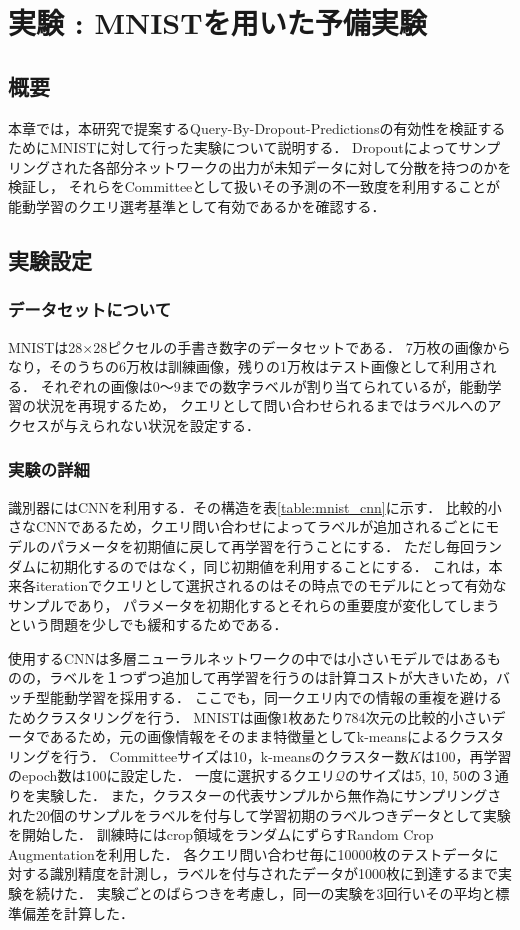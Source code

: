 \section{実験 : MNISTを用いた予備実験}

\subsection{概要}
本章では，本研究で提案するQuery-By-Dropout-Predictionsの有効性を検証するためにMNISTに対して行った実験について説明する．
Dropoutによってサンプリングされた各部分ネットワークの出力が未知データに対して分散を持つのかを検証し，
それらをCommitteeとして扱いその予測の不一致度を利用することが能動学習のクエリ選考基準として有効であるかを確認する．


\subsection{実験設定}

\subsubsection{データセットについて}
MNISTは28×28ピクセルの手書き数字のデータセットである．
7万枚の画像からなり，そのうちの6万枚は訓練画像，残りの1万枚はテスト画像として利用される．
それぞれの画像は0〜9までの数字ラベルが割り当てられているが，能動学習の状況を再現するため，
クエリとして問い合わせられるまではラベルへのアクセスが与えられない状況を設定する．


\subsubsection{実験の詳細}

識別器にはCNNを利用する．その構造を表\ref{table:mnist_cnn}に示す．
比較的小さなCNNであるため，クエリ問い合わせによってラベルが追加されるごとにモデルのパラメータを初期値に戻して再学習を行うことにする．
ただし毎回ランダムに初期化するのではなく，同じ初期値を利用することにする．
これは，本来各iterationでクエリとして選択されるのはその時点でのモデルにとって有効なサンプルであり，
パラメータを初期化するとそれらの重要度が変化してしまうという問題を少しでも緩和するためである．

使用するCNNは多層ニューラルネットワークの中では小さいモデルではあるものの，ラベルを１つずつ追加して再学習を行うのは計算コストが大きいため，バッチ型能動学習を採用する．
ここでも，同一クエリ内での情報の重複を避けるためクラスタリングを行う．
MNISTは画像1枚あたり784次元の比較的小さいデータであるため，元の画像情報をそのまま特徴量としてk-meansによるクラスタリングを行う．
Committeeサイズは10，k-meansのクラスター数$K$は100，再学習のepoch数は100に設定した．
一度に選択するクエリ$\mathcal{Q}$のサイズは5, 10, 50の３通りを実験した．
また，クラスターの代表サンプルから無作為にサンプリングされた20個のサンプルをラベルを付与して学習初期のラベルつきデータとして実験を開始した．
訓練時にはcrop領域をランダムにずらすRandom Crop Augmentationを利用した．
各クエリ問い合わせ毎に10000枚のテストデータに対する識別精度を計測し，ラベルを付与されたデータが1000枚に到達するまで実験を続けた．
実験ごとのばらつきを考慮し，同一の実験を3回行いその平均と標準偏差を計算した．

